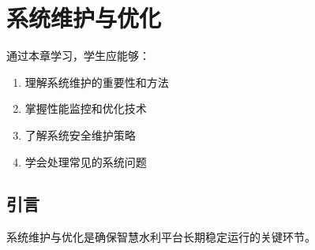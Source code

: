 \chapter{系统维护与优化}

\begin{learningobjectives}
通过本章学习，学生应能够：
\begin{enumerate}
    \item 理解系统维护的重要性和方法
    \item 掌握性能监控和优化技术
    \item 了解系统安全维护策略
    \item 学会处理常见的系统问题
\end{enumerate}
\end{learningobjectives}

\section{引言}

系统维护与优化是确保智慧水利平台长期稳定运行的关键环节。

